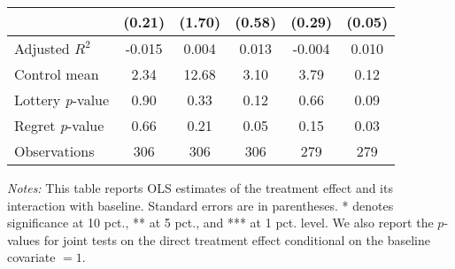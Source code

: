 \begin{table}[htbp]
{\begin{threeparttable}
\begin{tabular}{l*{5}{c}}
                &   (0.21)         &   (1.70)         &   (0.58)         &   (0.29)         &   (0.05)         \\
\midrule
Adjusted \(R^{2}\)&   -0.015         &    0.004         &    0.013         &   -0.004         &    0.010         \\
Control mean    &     2.34         &    12.68         &     3.10         &     3.79         &     0.12         \\
Lottery \emph{p}-value&     0.90         &     0.33         &     0.12         &     0.66         &     0.09         \\
Regret \emph{p}-value&     0.66         &     0.21         &     0.05         &     0.15         &     0.03         \\
Observations    &      306         &      306         &      306         &      279         &      279         \\
\bottomrule \end{tabular} \begin{tablenotes}[flushleft] \footnotesize \item \emph{Notes:} This table reports OLS estimates of the treatment effect and its interaction with baseline. Standard errors are in parentheses. * denotes significance at 10 pct., ** at 5 pct., and *** at 1 pct. level. We also report the \(p\)-values for joint tests on the direct treatment effect conditional on the baseline covariate $= 1$. \end{tablenotes} \end{threeparttable} } \end{table}
